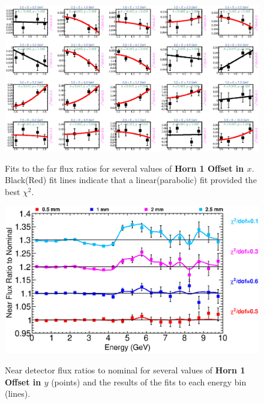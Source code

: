 \begin{figure}[ht]
  \begin{center}
    {\includegraphics[width=5.0in]{figures/Horn1XOffset_near_fits.eps}}
  \end{center}
\caption{ Fits to the far flux ratios for several values of {\bf Horn 1 Offset in $x$}. Black(Red) fit lines indicate that a linear(parabolic) fit provided the best $\chi^2$. }
\end{figure}

\begin{figure}[ht]
  \begin{center}
    {\includegraphics[width=6.0in]{figures/Horn1YOffset_near_summary.eps}}
  \end{center}
\caption{ Near detector flux ratios to nominal for several values of {\bf Horn 1 Offset in $y$} (points) and the results of the fits to each energy bin (lines).}
\end{figure}

